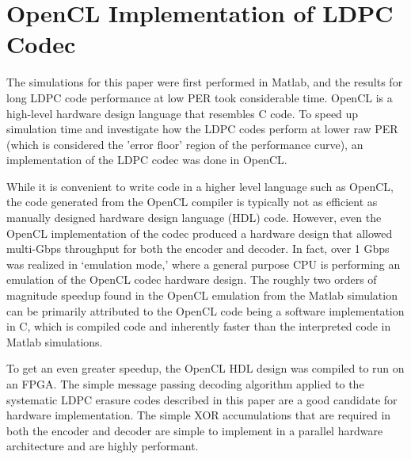 \documentclass[conference]{IEEEtran}
\begin{document}
\section{OpenCL Implementation of LDPC Codec}\label{sec:Implementation}

The simulations for this paper were first performed in Matlab, and the results for long LDPC code performance at low PER took considerable time.  OpenCL is a high-level hardware design language that resembles C code. To speed up simulation time and investigate how the LDPC codes perform at lower raw PER (which is considered the 'error floor' region of the performance curve), an implementation of the LDPC codec was done in OpenCL.

While it is convenient to write code in a higher level language such as OpenCL, the code generated from the OpenCL compiler is typically not as efficient as manually designed hardware design language (HDL) code.  However, even the OpenCL implementation of the codec produced a hardware design that allowed multi-Gbps throughput for both the encoder and decoder.  In fact, over 1 Gbps was realized in `emulation mode,' where a general purpose CPU is performing an emulation of the OpenCL codec hardware design.  The roughly two orders of magnitude speedup found in the OpenCL emulation from the Matlab simulation can be primarily attributed to the OpenCL code being a software implementation in C, which is compiled code and inherently faster than the interpreted code in Matlab simulations.

To get an even greater speedup, the OpenCL HDL design was compiled to run on an FPGA.  The simple message passing decoding algorithm applied to the systematic LDPC erasure codes described in this paper are a good candidate for hardware implementation.  The simple XOR accumulations that are required in both the encoder and decoder are simple to implement in a parallel hardware architecture and are highly performant. 
\end{document}
